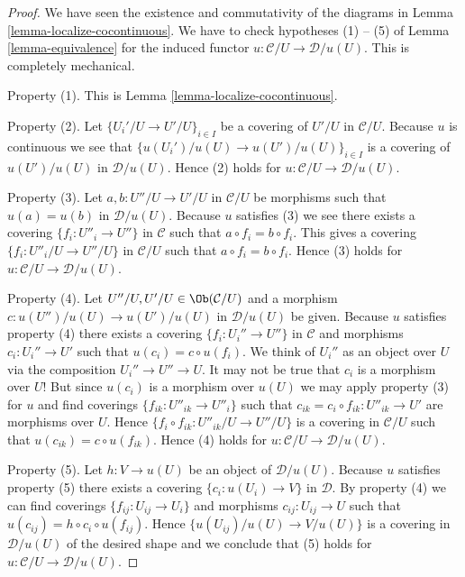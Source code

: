 \begin{proof}
We have seen the existence and commutativity of the diagrams in
Lemma \ref{lemma-localize-cocontinuous}. We have to check
hypotheses (1) -- (5) of Lemma \ref{lemma-equivalence} for the
induced functor $u : \mathcal{C}/U \to \mathcal{D}/u(U)$.
This is completely mechanical.

\medskip\noindent
Property (1). This is Lemma \ref{lemma-localize-cocontinuous}.

\medskip\noindent
Property (2). Let $\{U_i'/U \to U'/U\}_{i \in I}$ be a covering
of $U'/U$ in $\mathcal{C}/U$. Because $u$ is continuous we see that
$\{u(U_i')/u(U) \to u(U')/u(U)\}_{i \in I}$ is a covering
of $u(U')/u(U)$ in $\mathcal{D}/u(U)$. Hence (2) holds
for $u : \mathcal{C}/U \to \mathcal{D}/u(U)$.

\medskip\noindent
Property (3). Let $a, b : U''/U \to U'/U$ in $\mathcal{C}/U$
be morphisms such that $u(a) = u(b)$ in $\mathcal{D}/u(U)$.
Because $u$ satisfies (3) we see there exists a covering
$\{f_i : U''_i \to U''\}$ in $\mathcal{C}$ such that
$a \circ f_i = b \circ f_i$. This gives a covering
$\{f_i : U''_i/U \to U''/U\}$ in $\mathcal{C}/U$ such that
$a \circ f_i = b \circ f_i$. Hence (3) holds
for $u : \mathcal{C}/U \to \mathcal{D}/u(U)$.

\medskip\noindent
Property (4). Let $U''/U, U'/U \in \Ob(\mathcal{C}/U)$ and
a morphism $c : u(U'')/u(U) \to u(U')/u(U)$ in $\mathcal{D}/u(U)$
be given. Because $u$ satisfies property (4) there exists
a covering $\{f_i : U_i'' \to U''\}$ in $\mathcal{C}$
and morphisms $c_i : U_i'' \to U'$ such that $u(c_i) = c \circ u(f_i)$.
We think of $U_i''$ as an object over $U$ via the composition
$U_i'' \to U'' \to U$.
It may not be true that $c_i$ is a morphism over $U$!
But since $u(c_i)$ is a morphism over $u(U)$ we may apply
property (3) for $u$ and find coverings $\{f_{ik} : U''_{ik} \to U''_i\}$
such that $c_{ik} = c_i \circ f_{ik} : U''_{ik} \to U'$ are morphisms over $U$.
Hence $\{f_i \circ f_{ik} : U''_{ik}/U \to U''/U\}$ is a covering
in $\mathcal{C}/U$ such that $u(c_{ik}) = c \circ u(f_{ik})$.
Hence (4) holds
for $u : \mathcal{C}/U \to \mathcal{D}/u(U)$.

\medskip\noindent
Property (5). Let $h : V \to u(U)$ be an object of $\mathcal{D}/u(U)$.
Because $u$ satisfies property (5) there exists a covering
$\{c_i : u(U_i) \to V\}$ in $\mathcal{D}$. By property (4) we can find
coverings $\{f_{ij} : U_{ij} \to U_i\}$ and morphisms
$c_{ij} : U_{ij} \to U$ such that $u(c_{ij}) = h \circ c_i \circ u(f_{ij})$.
Hence $\{u(U_{ij})/u(U) \to V/u(U)\}$ is a covering in
$\mathcal{D}/u(U)$ of the desired shape and we conclude that
(5) holds for $u : \mathcal{C}/U \to \mathcal{D}/u(U)$.
\end{proof}

